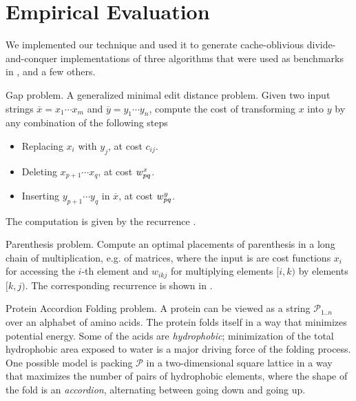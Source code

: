 \section{Empirical Evaluation}

We implemented our technique and used it to generate cache-oblivious
divide-and-conquer implementations of three algorithms that were used as
benchmarks in \cite{IPDPS15/Tithi}, and a few others.

\begin{paragraph}{Gap problem.}
A generalized minimal edit distance problem. Given two input strings 
$\overline{x}=x_1\cdots x_m$ and $\overline{y}=y_1\cdots y_n$,
compute the cost of transforming $x$ into $y$ by any combination of the
following steps
\begin{itemize}
  \item Replacing $x_i$ with $y_j$, at cost $c_{ij}$.
  \item Deleting $x_{p+1}\cdots x_q$, at cost $w^x_{pq}$.
  \item Inserting $y_{p+1}\cdots y_q$ in $\overline{x}$, at cost $w^y_{pq}$.
\end{itemize}

The computation is given by the recurrence .
\end{paragraph}

\begin{paragraph}{Parenthesis problem.} Compute
an optimal placements of parenthesis in a long chain of multiplication, e.g. of matrices, where the input is
are cost functions $x_i$ for accessing the $i$-th element and
$w_{ikj}$ for multiplying elements $[i,k)$ by elements $[k,j)$.
The corresponding recurrence is shown in .
\end{paragraph}

\begin{paragraph}{Protein Accordion Folding problem.} A protein can be viewed
as a string $\mathcal{P}_{1..n}$ over an alphabet of amino acids. 
The protein folds itself in a way that minimizes potential energy.
Some of the acids are {\em hydrophobic}; minimization of the total hydrophobic
area exposed to water is a major driving force of the folding process.
One possible model is packing $\mathcal{P}$ in a two-dimensional square lattice
in a way that maximizes the number of pairs of hydrophobic elements,
where the shape of the fold is an {\em accordion}, alternating between going down and going
up.
\end{paragraph}


